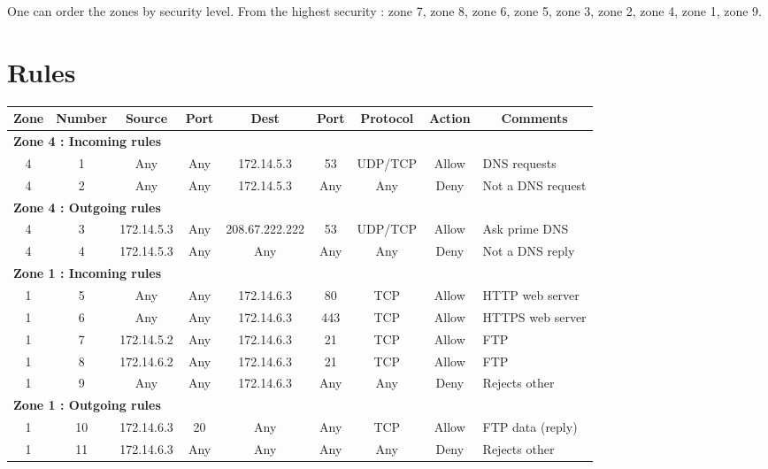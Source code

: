 \documentclass[a4paper,titlepage]{article}
\begin{document}
One can order the zones by security level. From the highest security : zone 7, zone 8, zone 6, zone 5, zone 3, zone 2, zone 4, zone 1, zone 9.

\section{Rules}
\label{sec:Rules}




\begin{table}[h]
	\center
	\begin{tabular}{c|c|cc|cc|ccl}
		Zone & Number & Source & Port & Dest & Port & Protocol & Action & \multicolumn{1}{c}{Comments}\\

		\hline
		\multicolumn{9}{l}{\textbf{Zone 4 : Incoming rules}}\\
		4 & 1 & Any & Any & 172.14.5.3 & 53 & UDP/TCP & Allow & DNS requests\\
		4 & 2 & Any & Any & 172.14.5.3 & Any & Any & Deny & Not a DNS request\\

		\hline
		\multicolumn{9}{l}{\textbf{Zone 4 : Outgoing rules}}\\
		4 & 3 & 172.14.5.3 & Any & 208.67.222.222 & 53 & UDP/TCP & Allow & Ask prime DNS\\
		4 & 4 & 172.14.5.3 & Any & Any & Any & Any & Deny & Not a DNS reply\\

		\hline
		\multicolumn{9}{l}{\textbf{Zone 1 : Incoming rules}}\\
		1 & 5 & Any & Any & 172.14.6.3 & 80 & TCP & Allow & HTTP web server\\
		1 & 6 & Any & Any & 172.14.6.3 & 443 & TCP & Allow & HTTPS web server\\
		1 & 7 & 172.14.5.2 & Any & 172.14.6.3 & 21 & TCP & Allow & FTP\\
		1 & 8 & 172.14.6.2 & Any & 172.14.6.3 & 21 & TCP & Allow & FTP\\
		1 & 9 & Any & Any & 172.14.6.3 & Any & Any & Deny & Rejects other\\

		\hline
		\multicolumn{9}{l}{\textbf{Zone 1 : Outgoing rules}}\\
		1 & 10 & 172.14.6.3 & 20 & Any & Any & TCP & Allow & FTP data (reply)\\
		1 & 11 & 172.14.6.3 & Any & Any & Any & Any & Deny & Rejects other\\


\end{tabular}
\end{table}
\end{document}

